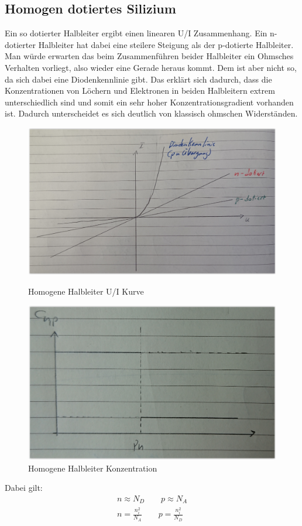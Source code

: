 \documentclass[12pt,a4paper]{report}%
\numberwithin{equation}{section}
\numberwithin{equation}{subsection}
\begin{document}
    \subsection{Homogen dotiertes Silizium}
    Ein so dotierter Halbleiter ergibt einen linearen U/I Zusammenhang. Ein n-dotierter Halbleiter hat dabei eine steilere Steigung als der p-dotierte Halbleiter. Man würde erwarten das beim Zusammenführen beider Halbleiter ein Ohmsches Verhalten vorliegt, also wieder eine Gerade heraus kommt. Dem ist aber nicht so, da sich dabei eine Diodenkennlinie gibt. Das erklärt sich dadurch, dass die Konzentrationen von Löchern und Elektronen in beiden Halbleitern extrem unterschiedlich sind und somit ein sehr hoher Konzentrationsgradient vorhanden ist. Dadurch unterscheidet es sich deutlich von klassisch ohmschen Widerständen.
    \begin{figure}[H] 
		\centering
		\begin{minipage}{.5\textwidth}
		  \centering
		  \captionsetup{justification=centering}
		  \includegraphics[width=0.9\linewidth]{hom_hl_kurven.png}
		  \caption{Homogene Halbleiter U/I Kurve}
		  \label{fig:hom_hl_kurven}
		\end{minipage}%
		\begin{minipage}{.5\textwidth}
		  \centering
		  \captionsetup{justification=centering}
		  \includegraphics[width=0.85\linewidth]{hom_hl_konz.png}
		  \caption{Homogene Halbleiter Konzentration}
		  \label{fig:hom_hl_konz}
		\end{minipage}
  \end{figure}
  Dabei gilt:
  \begin{align}
    n \approx N_D \qquad p \approx N_A\\
    n = \frac{n_i^2}{N_A} \qquad p = \frac{n_i^ 2}{N_D}
  \end{align}
\end{document}
